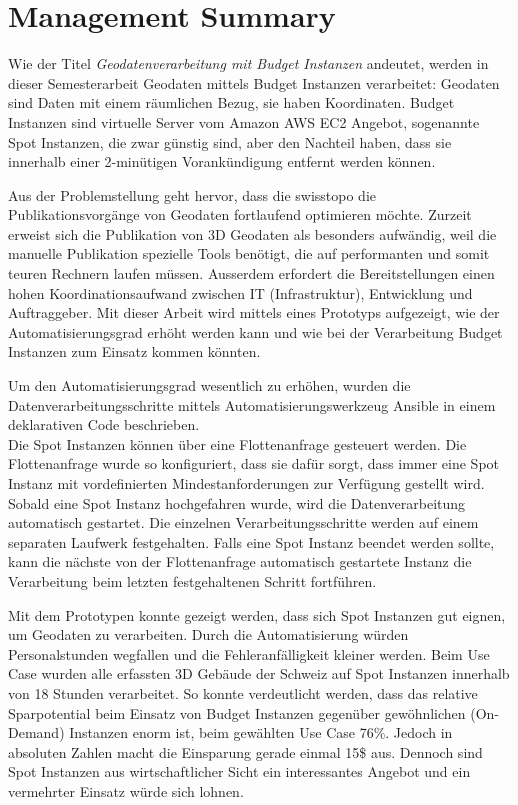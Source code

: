 \section{Management Summary}
Wie der Titel \emph{Geodatenverarbeitung mit Budget Instanzen} andeutet, werden in dieser Semesterarbeit Geodaten mittels Budget Instanzen verarbeitet: Geodaten sind Daten mit einem räumlichen Bezug, sie haben Koordinaten. Budget Instanzen sind virtuelle Server vom Amazon AWS EC2 Angebot, sogenannte Spot Instanzen, die zwar günstig sind, aber den Nachteil haben, dass sie innerhalb einer 2-minütigen Vorankündigung entfernt werden können.

Aus der Problemstellung geht hervor, dass die swisstopo die Publikationsvorgänge von Geodaten fortlaufend optimieren möchte. Zurzeit erweist sich die Publikation von 3D Geodaten als besonders aufwändig, weil die manuelle Publikation spezielle Tools benötigt, die auf performanten und somit teuren Rechnern laufen müssen. Ausserdem erfordert die Bereitstellungen einen hohen Koordinationsaufwand zwischen IT (Infrastruktur), Entwicklung und Auftraggeber.
Mit dieser Arbeit wird mittels eines Prototyps aufgezeigt, wie der Automatisierungsgrad erhöht werden kann und wie bei der Verarbeitung Budget Instanzen zum Einsatz kommen könnten.

Um den Automatisierungsgrad wesentlich zu erhöhen, wurden die Datenverarbeitungsschritte mittels Automatisierungswerkzeug Ansible in einem deklarativen Code beschrieben.\\ Die Spot Instanzen können über eine Flottenanfrage gesteuert werden. Die Flottenanfrage wurde so konfiguriert, dass sie dafür sorgt, dass immer eine Spot Instanz mit vordefinierten Mindestanforderungen zur Verfügung gestellt wird. Sobald eine Spot Instanz hochgefahren wurde, wird die Datenverarbeitung automatisch gestartet.
Die einzelnen Verarbeitungsschritte werden auf einem separaten Laufwerk festgehalten. Falls eine Spot Instanz beendet werden sollte, kann die nächste von der Flottenanfrage automatisch gestartete Instanz die Verarbeitung beim letzten festgehaltenen Schritt fortführen.

Mit dem Prototypen konnte gezeigt werden, dass sich Spot Instanzen gut eignen, um Geodaten zu verarbeiten. Durch die Automatisierung würden Personalstunden wegfallen und die Fehleranfälligkeit kleiner werden. Beim Use Case wurden alle erfassten 3D Gebäude der Schweiz auf Spot Instanzen innerhalb von 18 Stunden verarbeitet.
So konnte verdeutlicht werden, dass das relative Sparpotential beim Einsatz von Budget Instanzen gegenüber gewöhnlichen (On-Demand) Instanzen enorm ist, beim gewählten Use Case 76\%. Jedoch in absoluten Zahlen macht die Einsparung gerade einmal 15\$ aus. Dennoch sind Spot Instanzen aus wirtschaftlicher Sicht ein interessantes Angebot und ein vermehrter Einsatz würde sich lohnen.

\pagebreak